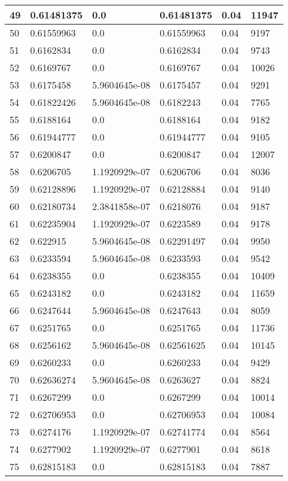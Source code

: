 \begin{longtable}{|l|l|l|l|l|l|}
49 & 0.61481375 & 0.0 & 0.61481375 & 0.04 & 11947 \\ \hline 
50 & 0.61559963 & 0.0 & 0.61559963 & 0.04 & 9197 \\ \hline 
51 & 0.6162834 & 0.0 & 0.6162834 & 0.04 & 9743 \\ \hline 
52 & 0.6169767 & 0.0 & 0.6169767 & 0.04 & 10026 \\ \hline 
53 & 0.6175458 & 5.9604645e-08 & 0.6175457 & 0.04 & 9291 \\ \hline 
54 & 0.61822426 & 5.9604645e-08 & 0.6182243 & 0.04 & 7765 \\ \hline 
55 & 0.6188164 & 0.0 & 0.6188164 & 0.04 & 9182 \\ \hline 
56 & 0.61944777 & 0.0 & 0.61944777 & 0.04 & 9105 \\ \hline 
57 & 0.6200847 & 0.0 & 0.6200847 & 0.04 & 12007 \\ \hline 
58 & 0.6206705 & 1.1920929e-07 & 0.6206706 & 0.04 & 8036 \\ \hline 
59 & 0.62128896 & 1.1920929e-07 & 0.62128884 & 0.04 & 9140 \\ \hline 
60 & 0.62180734 & 2.3841858e-07 & 0.6218076 & 0.04 & 9187 \\ \hline 
61 & 0.62235904 & 1.1920929e-07 & 0.6223589 & 0.04 & 9178 \\ \hline 
62 & 0.622915 & 5.9604645e-08 & 0.62291497 & 0.04 & 9950 \\ \hline 
63 & 0.6233594 & 5.9604645e-08 & 0.6233593 & 0.04 & 9542 \\ \hline 
64 & 0.6238355 & 0.0 & 0.6238355 & 0.04 & 10409 \\ \hline 
65 & 0.6243182 & 0.0 & 0.6243182 & 0.04 & 11659 \\ \hline 
66 & 0.6247644 & 5.9604645e-08 & 0.6247643 & 0.04 & 8059 \\ \hline 
67 & 0.6251765 & 0.0 & 0.6251765 & 0.04 & 11736 \\ \hline 
68 & 0.6256162 & 5.9604645e-08 & 0.62561625 & 0.04 & 10145 \\ \hline 
69 & 0.6260233 & 0.0 & 0.6260233 & 0.04 & 9429 \\ \hline 
70 & 0.62636274 & 5.9604645e-08 & 0.6263627 & 0.04 & 8824 \\ \hline 
71 & 0.6267299 & 0.0 & 0.6267299 & 0.04 & 10014 \\ \hline 
72 & 0.62706953 & 0.0 & 0.62706953 & 0.04 & 10084 \\ \hline 
73 & 0.6274176 & 1.1920929e-07 & 0.62741774 & 0.04 & 8564 \\ \hline 
74 & 0.6277902 & 1.1920929e-07 & 0.6277901 & 0.04 & 8618 \\ \hline 
75 & 0.62815183 & 0.0 & 0.62815183 & 0.04 & 7887 \\ \hline 
\end{longtable}